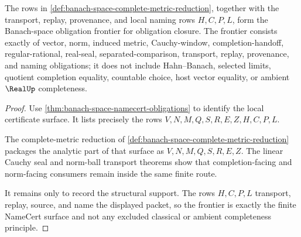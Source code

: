 \begin{theorem}
\label{thm:banach-space-namecert-frontier}
The rows in \autoref{def:banach-space-complete-metric-reduction}, together with the transport, replay, provenance, and local naming rows $H,C,P,L$, form the Banach-space obligation frontier for obligation closure. The frontier consists exactly of vector, norm, induced metric, Cauchy-window, completion-handoff, regular-rational, real-seal, separated-comparison, transport, replay, provenance, and naming obligations; it does not include Hahn--Banach, selected limits, quotient completion equality, countable choice, host vector equality, or ambient $\RealUp$ completeness.
\end{theorem}
\begin{proof}
Use \autoref{thm:banach-space-namecert-obligations} to identify the local certificate surface. It lists precisely the rows $V,N,M,Q,S,R,E,Z,H,C,P,L$.

The complete-metric reduction of \autoref{def:banach-space-complete-metric-reduction} packages the analytic part of that surface as $V,N,M,Q,S,R,E,Z$. The linear Cauchy seal and norm-ball transport theorems show that completion-facing and norm-facing consumers remain inside the same finite route.

It remains only to record the structural support. The rows $H,C,P,L$ transport, replay, source, and name the displayed packet, so the frontier is exactly the finite NameCert surface and not any excluded classical or ambient completeness principle.
\end{proof}

